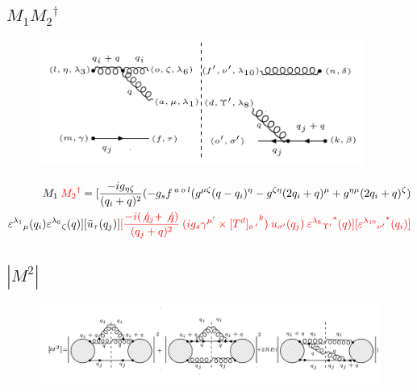 \subsection{$M_1 {M_2}^{\dagger}$}
\begin{figure}[ht!]
\centering
\includegraphics[width=0.95\textwidth]{images/ggqM1M2dagger.png}
\end{figure}
\begin{equation}
\begin{split}
M_1\:{\color[RGB]{255,0,0} {M_2}^{\dagger}}=[\frac{-ig_{{\eta}{\zeta}}}{(q_i +q)^2}(-g_s f^{\:a\:o\:l}(g^{{\mu}{\zeta}}(q-q_i)^{\eta}-g^{{\zeta}{\eta}}(2q_i +q)^{\mu}+g^{{\eta}{\mu}}(2q_i +q)^{\zeta})\\
{\varepsilon^{\lambda_1}}_{\mu} (q_i) {\varepsilon^{\lambda_6}}_{\zeta} (q)][\bar{u}_{\tau}(q_j)]
{\color[RGB]{255,0,0}[\frac{-i(\not{q_j} + \not{q})}{(q_j + q)^2} \:  (ig_s \gamma^{{\mu}^{\prime}}\times {[T^d]_{o\:^{\prime}}}^k) \: u_{{\sigma}^{\prime}}(q_j) \: {{\varepsilon^{\lambda_8}}_{{\Upsilon}^{\prime}}}^* (q)][{{\varepsilon^{\lambda_{10}}}_{{\nu}^{\prime}}}^* (q_i)]}
\end{split}
\end{equation}









%


\pagebreak

\subsection{$|M^{2}|$}
\begin{figure}[ht!]
\centering
\includegraphics[width=1.0\textwidth]{images/ggq-MSquerRE.png}

\end{figure}
